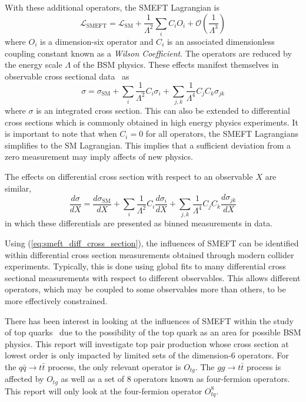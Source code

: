 \documentclass[a4paper,11pt]{article}
\begin{document}
With these additional operators, the SMEFT Lagrangian is
\begin{equation}\label{eq:smeft_lagrangian}
    \mathcal{L}_{\text{SMEFT}} = \mathcal{L}_{\text{SM}} + \frac{1}{\Lambda^2} \sum\limits_{i} C_{i} O_{i} + \mathcal{O}\left(\frac{1}{\Lambda^3}\right)
\end{equation}
where $O_{i}$ is a dimension-six operator and $C_{i}$ is an associated dimensionless coupling constant known as a \emph{Wilson Coefficient}.
The operators are reduced by the energy scale $\Lambda$ of the BSM physics.
These effects manifest themselves in observable cross sectional data~\cite{Hartland_2019} as
\begin{equation}\label{eq:smeft_cross_section}
    \sigma = \sigma_{\text{SM}} + \sum\limits_{i} \frac{1}{\Lambda^2} C_{i} \sigma_{i} + \sum\limits_{j,k} \frac{1}{\Lambda^4} C_{j} C_{k} \sigma_{j k}
\end{equation}
where $\sigma$ is an integrated cross section. This can also be extended to differential cross sections which is commonly obtained in high energy physics experiments.
It is important to note that when $C_{i}=0$ for all operators, the SMEFT Lagrangians simplifies to the SM Lagrangian.
This implies that a sufficient deviation from a zero measurement may imply affects of new physics.

The effects on differential cross section with respect to an observable $X$ are similar,
\begin{equation}\label{eq:smeft_diff_cross_section}
    \frac{d\sigma}{dX} = \frac{d\sigma_{\text{SM}}}{dX} + \sum\limits_{i} \frac{1}{\Lambda^2} C_{i} \frac{d\sigma_{i}}{dX} + \sum\limits_{j,k} \frac{1}{\Lambda^4} C_{j} C_{k} \frac{d\sigma_{j k}}{dX}
\end{equation}
in which these differentials are presented as binned measurements in data.

Using (\ref{eq:smeft_diff_cross_section}), the influences of SMEFT can be identified within differential cross section measurements obtained through modern collider experiments.
Typically, this is done using global fits to many differential cross sectional measurements with respect to different observables.
This allows different operators, which may be coupled to some observables more than others, to be more effectively constrained.

There has been interest in looking at the influences of SMEFT within the study of top quarks~\cite{Hartland_2019,Buckley_2015,Brivio_2020} due to the possibility of the top quark as an area for possible BSM physics.
This report will investigate top pair production whose cross section at lowest order is only impacted by limited sets of the dimension-6 operators. For the $q\bar{q} \rightarrow t\bar{t}$ process, the only relevant operator is $O_{tg}$.
The $gg \rightarrow t\bar{t}$ process is affected by $O_{tg}$ as well as a set of 8 operators known as four-fermion operators.
This report will only look at the four-fermion operator $O_{tq}^{8}$.
\end{document}
